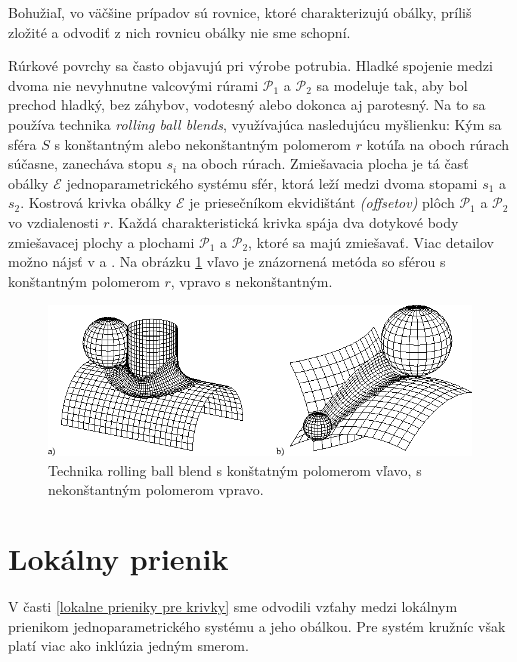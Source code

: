 Bohužiaľ, vo väčšine prípadov sú rovnice, ktoré charakterizujú obálky, príliš zložité a odvodiť z nich rovnicu obálky nie sme schopní.

Rúrkové povrchy sa často objavujú pri výrobe potrubia. Hladké spojenie medzi dvoma nie nevyhnutne valcovými rúrami $\mathcal{P}_1$ a $\mathcal{P}_2$ sa modeluje tak, aby bol prechod hladký, bez záhybov, vodotesný alebo dokonca aj parotesný. Na to sa používa technika \textit{rolling ball blends}, využívajúca nasledujúcu myšlienku: Kým sa sféra $S$ s konštantným alebo nekonštantným polomerom $r$ kotúľa na oboch rúrach súčasne, zanecháva stopu $s_i$ na oboch rúrach. Zmiešavacia plocha je tá časť obálky $\mathcal{E}$ jednoparametrického systému sfér, ktorá leží medzi dvoma stopami $s_1$ a $s_2$. Kostrová krivka obálky $\mathcal{E}$ je priesečníkom ekvidištánt \textit{(offsetov)} plôch $\mathcal{P}_1$ a $\mathcal{P}_2$ vo vzdialenosti $r$. Každá charakteristická krivka spája dva dotykové body zmiešavacej plochy a plochami $\mathcal{P}_1$ a $\mathcal{P}_2$, ktoré sa majú zmiešavať. Viac detailov možno nájsť v \cite{Kar00} a \cite{Ode20}. Na obrázku \ref{fig:rolling_ball_blends} vľavo je znázornená metóda so sférou s konštantným polomerom $r$, vpravo s nekonštantným.

\begin{figure}[H]
	\centering
	\includegraphics[width=\textwidth]{images/rolling_ball_blends.png}
	\caption[Technika rolling ball blends.]{Technika rolling ball blend s konštatným polomerom vľavo, s nekonštantným polomerom vpravo. \cite{Rollingballblends}}
	\label{fig:rolling_ball_blends}
\end{figure}

\section{Lokálny prienik}
V časti \ref{lokalne prieniky pre krivky} sme odvodili vzťahy medzi lokálnym prienikom jednoparametrického systému a jeho obálkou. Pre systém kružníc však platí viac ako inklúzia jedným smerom.

